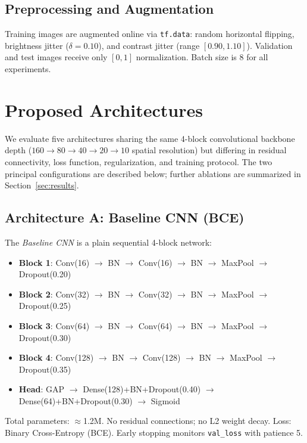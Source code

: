 \documentclass[10pt,twocolumn]{article}
\begin{document}
\subsection{Preprocessing and Augmentation}

Training images are augmented online via \texttt{tf.data}:
random horizontal flipping, brightness jitter ($\delta{=}0.10$),
and contrast jitter (range $[0.90, 1.10]$).
Validation and test images receive only $[0,1]$ normalization.
Batch size is 8 for all experiments.

\section{Proposed Architectures}
\label{sec:arch}

We evaluate five architectures sharing the same 4-block convolutional backbone
depth ($160{\to}80{\to}40{\to}20{\to}10$ spatial resolution) but differing in
residual connectivity, loss function, regularization, and training protocol.
The two principal configurations are described below; further ablations are
summarized in Section~\ref{sec:results}.

\subsection{Architecture A: Baseline CNN (BCE)}

The \emph{Baseline CNN} is a plain sequential 4-block network:

\begin{itemize}[leftmargin=1.2em, itemsep=0pt]
  \item \textbf{Block 1}: Conv(16) $\to$ BN $\to$ Conv(16) $\to$ BN $\to$ MaxPool $\to$ Dropout(0.20)
  \item \textbf{Block 2}: Conv(32) $\to$ BN $\to$ Conv(32) $\to$ BN $\to$ MaxPool $\to$ Dropout(0.25)
  \item \textbf{Block 3}: Conv(64) $\to$ BN $\to$ Conv(64) $\to$ BN $\to$ MaxPool $\to$ Dropout(0.30)
  \item \textbf{Block 4}: Conv(128) $\to$ BN $\to$ Conv(128) $\to$ BN $\to$ MaxPool $\to$ Dropout(0.35)
  \item \textbf{Head}: GAP $\to$ Dense(128)+BN+Dropout(0.40) $\to$ Dense(64)+BN+Dropout(0.30) $\to$ Sigmoid
\end{itemize}

Total parameters: $\approx$1.2M. No residual connections; no L2 weight decay.
Loss: Binary Cross-Entropy (BCE). Early stopping monitors \texttt{val\_loss}
with patience 5.
\end{document}
